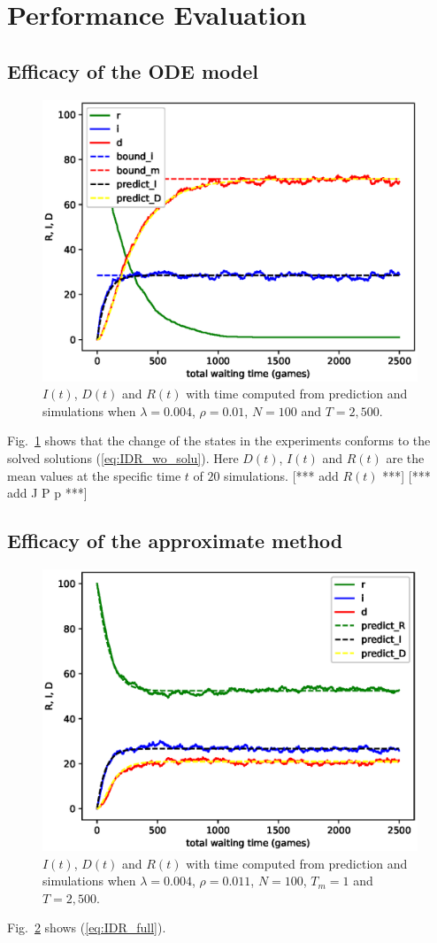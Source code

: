 \section{Performance Evaluation}
\subsection{Efficacy of the ODE model}
\label{subsec:pe_valid}
\begin{figure}
  \includegraphics[width=.45\textwidth]{fig/twohop_without_detection.eps}
  \caption{$I(t)$, $D(t)$ and $R(t)$ with time computed from prediction and simulations when $\lambda = 0.004$, $\rho = 0.01$, $N=100$ and $T=2,500$.}
  \label{fig:twohop_predict_wod}
\end{figure}
Fig.~\ref{fig:twohop_predict_wod} shows that the change of the states
in the experiments conforms to the solved solutions (\ref{eq:IDR_wo_solu}).
Here $D(t)$, $I(t)$ and $R(t)$ are the mean values
at the specific time $t$ of $20$ simulations.
[*** add $R(t)$ ***]
[*** add J P p ***]

\subsection{Efficacy of the approximate method}
\begin{figure}
  \includegraphics[width=.45\textwidth]{fig/twohop_with_fully_detection.eps}
  \caption{$I(t)$, $D(t)$ and $R(t)$ with time computed from prediction and simulations when $\lambda = 0.004$, $\rho = 0.011$, $N=100$,
  $T_{m} = 1$ and $T=2,500$.}
  \label{fig:twohop_predict_full_d}
\end{figure}
Fig.~\ref{fig:twohop_predict_full_d} shows (\ref{eq:IDR_full}).

